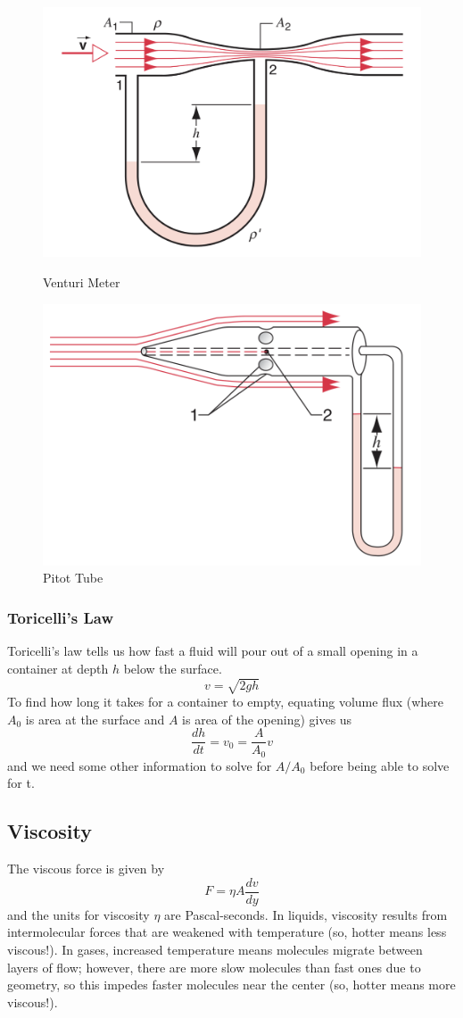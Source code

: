 \documentclass[../PhysicsFormulae.tex]{subfiles}
\begin{document}
\begin{figure}
\centering
\begin{minipage}{.5\textwidth}
  \centering
  \includegraphics[width=0.7\linewidth]{images/12.venturi_meter.png}
  \caption{Venturi Meter}
  \label{fig:venturi_meter}
\end{minipage}%
\begin{minipage}{.5\textwidth}
  \centering
  \includegraphics[width=0.7\linewidth]{images/12.pitot_tube.png}
  \caption{Pitot Tube}
  \label{fig:pitot_tube}
\end{minipage}
\end{figure}

\subsubsection{Toricelli's Law}
Toricelli's law tells us how fast a fluid will pour out of a small opening in a container at depth $h$ below the surface. 
\[ v = \sqrt{2gh} \]
To find how long it takes for a container to empty, equating volume flux (where $A_0$ is area at the surface and $A$ is area of the opening) gives us 
\[ \frac{dh}{dt} = v_0 = \frac{A}{A_0}v \]
and we need some other information to solve for $A/A_0$ before being able to solve for t. 

\subsection{Viscosity}
The viscous force is given by
\[ F = \eta A \frac{dv}{dy} \]
and the units for viscosity $\eta$ are Pascal-seconds. In liquids, viscosity results from intermolecular forces that are weakened with temperature (so, hotter means less viscous!). In gases, increased temperature means molecules migrate between layers of flow; however, there are more slow molecules than fast ones due to geometry, so this impedes faster molecules near the center (so, hotter means more viscous!).  
\end{document}
